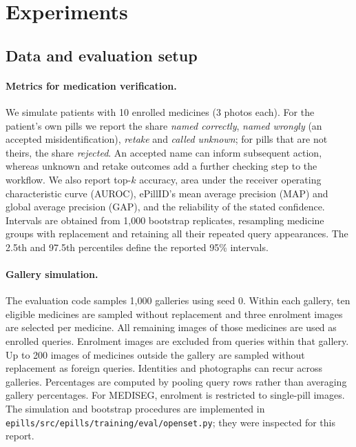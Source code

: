 \section{Experiments}
\label{sec:experiments}

\subsection{Data and evaluation setup}
\label{sec:setup}



\paragraph{Metrics for medication verification.} We simulate patients with 10 enrolled medicines (3 photos each). For the
patient's own pills we report the share \emph{named correctly}, \emph{named wrongly} (an accepted misidentification),
\emph{retake} and \emph{called unknown}; for pills that are not theirs, the share \emph{rejected}. An accepted name can inform subsequent action, whereas unknown and retake outcomes add a further checking step to the workflow. We also report top-$k$ accuracy, area under the receiver operating characteristic curve (AUROC),
ePillID's mean average precision (MAP) and global average precision (GAP), and the reliability of the stated confidence. Intervals are obtained from 1,000 bootstrap replicates, resampling medicine groups with replacement and
retaining all their repeated query appearances. The 2.5th and 97.5th percentiles define the reported 95\% intervals.

\paragraph{Gallery simulation.} The evaluation code samples 1,000 galleries using seed 0. Within each
gallery, ten eligible medicines are sampled without replacement and three enrolment images are selected per
medicine. All remaining images of those medicines are used as enrolled queries. Enrolment images are excluded
from queries within that gallery. Up to 200 images of medicines outside the gallery are sampled without
replacement as foreign queries. Identities and photographs can recur across galleries. Percentages are computed
by pooling query rows rather than averaging gallery percentages. For MEDISEG, enrolment is restricted to
single-pill images. The simulation and bootstrap procedures are implemented in
\texttt{epills/src/epills/training/eval/openset.py}; they were inspected for this report.

